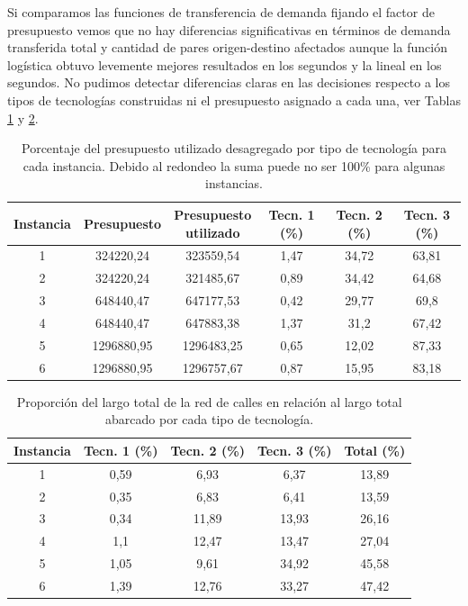 Si comparamos las funciones de transferencia de demanda fijando el factor de presupuesto vemos que no hay diferencias significativas en términos de demanda transferida total y cantidad de pares origen-destino afectados aunque la función logística obtuvo levemente mejores resultados en los segundos y la lineal en los segundos. No pudimos detectar diferencias claras en las decisiones respecto a los tipos de tecnologías construidas ni el presupuesto asignado a cada una, ver Tablas \ref{table:montevideobudgetusage} y \ref{table:montevideoinfracoverage}.

\begin{table}[h!]
  \centering
  \begin{adjustbox}{width=1.2\textwidth,center=\textwidth}
    \begin{tabular}{cccccc}
      \toprule
        Instancia & Presupuesto & \shortstack{Presupuesto \\ utilizado} & Tecn. 1 (\%) & Tecn. 2 (\%) & Tecn. 3 (\%) \\
      \midrule
        1 & 324220,24 & 323559,54 & 1,47 & 34,72 & 63,81 \\
        2 & 324220,24 & 321485,67 & 0,89 & 34,42 & 64,68 \\
        3 & 648440,47 & 647177,53 & 0,42 & 29,77 & 69,8 \\
        4 & 648440,47 & 647883,38 & 1,37 & 31,2 & 67,42 \\
        5 & 1296880,95 & 1296483,25 & 0,65 & 12,02 & 87,33 \\
        6 & 1296880,95 & 1296757,67 & 0,87 & 15,95 & 83,18 \\
      \bottomrule
    \end{tabular}
  \end{adjustbox}
  \caption{Porcentaje del presupuesto utilizado desagregado por tipo de tecnología para cada instancia. Debido al redondeo la suma puede no ser 100\% para algunas instancias.}\label{table:montevideobudgetusage}
\end{table}

\begin{table}[h!]
  \centering
  \begin{tabular}{ccccc}
    \toprule
      Instancia & Tecn. 1 (\%) & Tecn. 2 (\%) & Tecn. 3 (\%) & Total (\%) \\
    \midrule
      1 & 0,59 & 6,93 & 6,37 & 13,89 \\
      2 & 0,35 & 6,83 & 6,41 & 13,59 \\
      3 & 0,34 & 11,89 & 13,93 & 26,16 \\
      4 & 1,1 & 12,47 & 13,47 & 27,04 \\
      5 & 1,05 & 9,61 & 34,92 & 45,58 \\
      6 & 1,39 & 12,76 & 33,27 & 47,42 \\
    \bottomrule
  \end{tabular}
  \caption{Proporción del largo total de la red de calles en relación al largo total abarcado por cada tipo de tecnología.}
  \label{table:montevideoinfracoverage}
\end{table}

